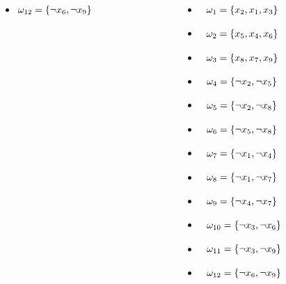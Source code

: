 \documentclass{beamer}
\begin{document}
\begin{frame}
{\begin{columns}[t]
\begin{column}[T]{.3\textwidth}
\begin{itemize}
		\item[] $\omega_{12} = \{\neg x_6  ,  \neg x_9\} \tikz[baseline]{\node[anchor=base] (a12){};}$
		\end{itemize}
		\end{column}
		\begin{column}[T]{.3\textwidth}
		\tiny
		\begin{itemize}
		\item[] $\tikz[baseline]{\node[anchor=base] (b1){};} \omega_{1} = \{x_2  ,  x_1  ,  x_3\}$
		\item[] $\tikz[baseline]{\node[anchor=base] (b2){};} \omega_{2} = \{x_5  ,  x_4  ,  x_6\} $
		\item[] $\tikz[baseline]{\node[anchor=base] (b3){};} \omega_{3} = \{x_8  ,  x_7  ,  x_9\} $
		\item[] $\tikz[baseline]{\node[anchor=base] (b4){};} \omega_{4} = \{\neg x_2  ,  \neg x_5\} $
		\item[] $\tikz[baseline]{\node[anchor=base] (b5){};} \omega_{5} = \{\neg x_2  ,  \neg x_8\} $
		\item[] $\tikz[baseline]{\node[anchor=base] (b6){};} \omega_{6} = \{\neg x_5  ,  \neg x_8\} $
		\item[] $\tikz[baseline]{\node[anchor=base] (b7){};} \omega_{7} = \{\neg x_1  ,  \neg x_4\} $
		\item[] $\tikz[baseline]{\node[anchor=base] (b8){};} \omega_{8} = \{\neg x_1  ,  \neg x_7\} $
		\item[] $\tikz[baseline]{\node[anchor=base] (b9){};} \omega_{9} = \{\neg x_4  ,  \neg x_7\} $
		\item[] $\tikz[baseline]{\node[anchor=base] (b10){};} \omega_{10} = \{\neg x_3  ,  \neg x_6\} $
		\item[] $\tikz[baseline]{\node[anchor=base] (b11){};} \omega_{11} = \{\neg x_3  ,  \neg x_9\} $
		\item[] $\tikz[baseline]{\node[anchor=base] (b12){};} \omega_{12} = \{\neg x_6  ,  \neg x_9\} $
	\end{itemize}
	\end{column}
\end{columns}

}


\end{frame}
\end{document}
